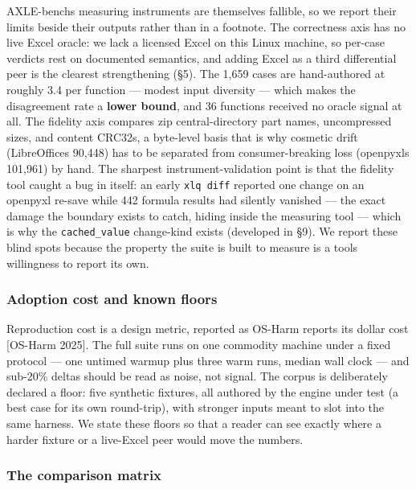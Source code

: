 \documentclass[
]{article}
\begin{document}
AXLE-bench\textquotesingle s measuring instruments are themselves
fallible, so we report their limits beside their outputs rather than in
a footnote. The correctness axis has no live Excel oracle: we lack a
licensed Excel on this Linux machine, so per-case verdicts rest on
documented semantics, and adding Excel as a third differential peer is
the clearest strengthening (§5). The 1,659 cases are hand-authored at
roughly 3.4 per function --- modest input diversity --- which makes the
disagreement rate a \textbf{lower bound}, and 36 functions received no
oracle signal at all. The fidelity axis compares zip central-directory
part names, uncompressed sizes, and content CRC32s, a byte-level basis
that is why cosmetic drift (LibreOffice\textquotesingle s 90,448) has to
be separated from consumer-breaking loss (openpyxl\textquotesingle s
101,961) by hand. The sharpest instrument-validation point is that the
fidelity tool caught a bug in itself: an early \texttt{xlq\ diff}
reported one change on an openpyxl re-save while 442 formula results had
silently vanished --- the exact damage the boundary exists to catch,
hiding inside the measuring tool --- which is why the
\texttt{cached\_value} change-kind exists (developed in §9). We report
these blind spots because the property the suite is built to measure is
a tool\textquotesingle s willingness to report its own.

\subsubsection{Adoption cost and known
floors}\label{adoption-cost-and-known-floors}

Reproduction cost is a design metric, reported as OS-Harm reports its
dollar cost {[}OS-Harm 2025{]}. The full suite runs on one commodity
machine under a fixed protocol --- one untimed warmup plus three warm
runs, median wall clock --- and sub-20\% deltas should be read as noise,
not signal. The corpus is deliberately declared a floor: five synthetic
fixtures, all authored by the engine under test (a best case for its own
round-trip), with stronger inputs meant to slot into the same harness.
We state these floors so that a reader can see exactly where a harder
fixture or a live-Excel peer would move the numbers.

\subsubsection{The comparison matrix}\label{the-comparison-matrix}
\end{document}
